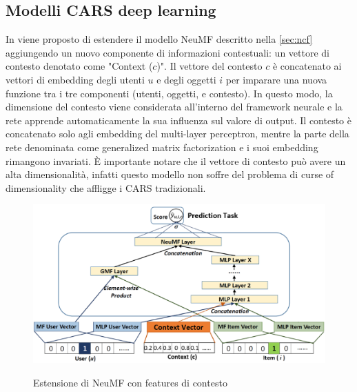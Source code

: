 \subsection{Modelli CARS deep learning}
In \cite{context-aware-deep-learning} viene proposto di estendere il modello NeuMF \cite{NCF} descritto nella \autoref{sec:ncf} aggiungendo un nuovo componente di informazioni contestuali: un vettore di contesto denotato come "Context ($c$)". Il vettore del contesto $c$ è concatenato ai vettori di embedding degli utenti $u$ e degli oggetti $i$ per imparare una nuova funzione tra i tre componenti (utenti, oggetti, e contesto). In questo modo, la dimensione del contesto viene considerata all'interno del framework neurale e la rete apprende automaticamente la sua influenza sul valore di output. Il contesto è concatenato solo agli embedding del multi-layer perceptron, mentre la parte della rete denominata come generalized matrix factorization e i suoi embedding rimangono invariati. \`E importante notare che il vettore di contesto può avere un alta dimensionalità, infatti questo modello non soffre del problema di curse of dimensionality che affligge i CARS tradizionali.
\begin{figure}
  \centering
  \includegraphics[width=\linewidth]{immagini/cars-ncf.png}
  \caption{Estensione di NeuMF con features di contesto}
  \label{fig:context-neumf}
  \cite{context-aware-deep-learning}
\end{figure}

